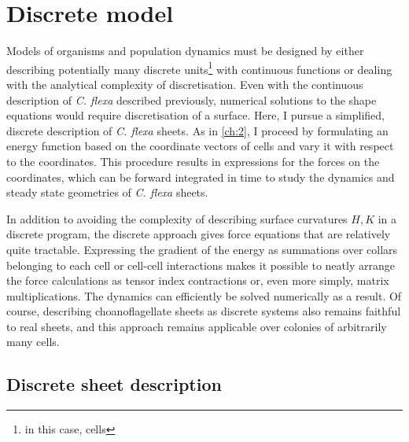 \chapter{Discrete model} \label{ch:3}

\ifpdf
    \graphicspath{{Chapter3/Figs/Raster/}{Chapter3/Figs/PDF/}{Chapter3/Figs/}}
\else
    \graphicspath{{Chapter3/Figs/Vector/}{Chapter3/Figs/}}
\fi

Models of organisms and population dynamics must be designed by either describing potentially many discrete units\footnote{in this case, cells} with continuous functions or dealing with the analytical complexity of discretisation. 
Even with the continuous description of \textit{C. flexa} described previously, numerical solutions to the shape equations would require discretisation of a surface. 
Here, I pursue a simplified, discrete description of \textit{C. flexa} sheets. 
As in \cref{ch:2}, I proceed by formulating an energy function based on the coordinate vectors of cells and vary it with respect to the coordinates. 
This procedure results in expressions for the forces on the coordinates, which can be forward integrated in time to study the dynamics and steady state geometries of \textit{C. flexa} sheets.

In addition to avoiding the complexity of describing surface curvatures $H, K$ in a discrete program, the discrete approach gives force equations that are relatively quite tractable. 
Expressing the gradient of the energy as summations over collars belonging to each cell or cell-cell interactions makes it possible to neatly arrange the force calculations as tensor index contractions or, even more simply, matrix multiplications. 
The dynamics can efficiently be solved numerically as a result.
Of course, describing choanoflagellate sheets as discrete systems also remains faithful to real sheets, and this approach remains applicable over colonies of arbitrarily many cells.

\section{Discrete sheet description} \label{sec:description}


